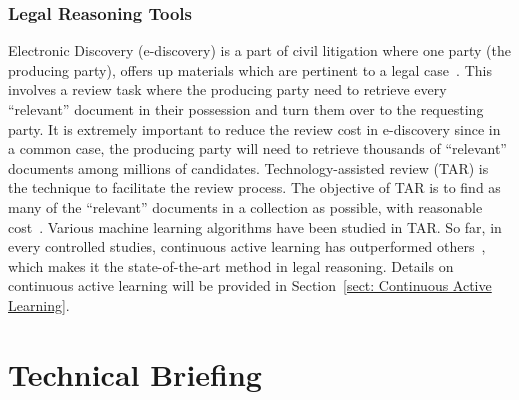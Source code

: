 \documentclass[final,twocolumn,5p]{elsarticle}
\theoremstyle{break}
\begin{document}
\subsubsection{Legal Reasoning Tools}
\label{sect: Electronic Discovery}

Electronic Discovery (e-discovery) is a part of civil litigation where one party (the producing party), offers up materials which are pertinent to a legal case~\cite{krishna2016bigse}. This involves a review task where the producing party need to retrieve every ``relevant'' document in their possession and turn them over to the requesting party. It is extremely important to reduce the review cost in e-discovery since in a common case, the producing party will need to retrieve thousands of ``relevant'' documents among millions of candidates. Technology-assisted review (TAR) is the technique to facilitate the review process. The objective of TAR is to find as many
of the ``relevant'' documents in a collection as possible, with reasonable cost~\cite{grossman2013}. Various machine learning algorithms have been studied in TAR. So far, in every controlled studies, continuous active learning has outperformed others~\cite{cormack2014evaluation,cormack2015autonomy}, which makes it the state-of-the-art method in legal reasoning. Details on continuous active learning will be provided in Section~\ref{sect: Continuous Active Learning}.




\section{Technical Briefing}
\label{sect: Technical Briefing}
\end{document}

